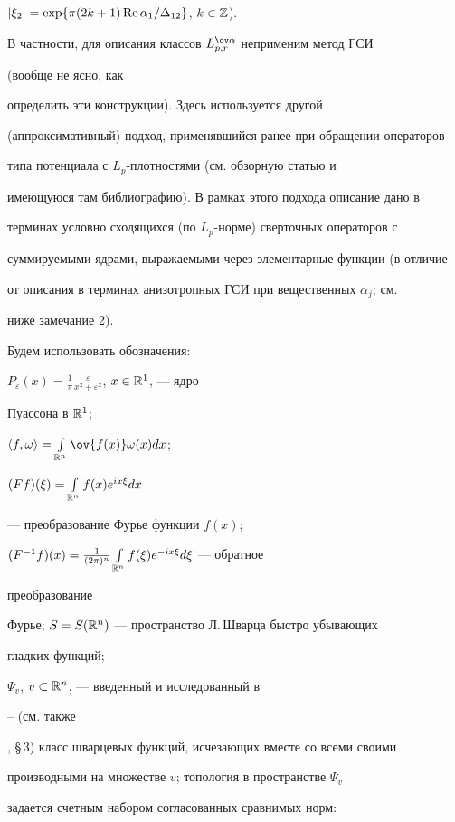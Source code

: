 $|\xi_2|=\exp\{\pi(2k+1)\operatorname{Re}\alpha_1/\Delta_{12}\}$, $k\in\Bbb Z$).


В частности, для описания классов $\spaceL$ неприменим метод ГСИ


(вообще не ясно, как


определить эти конструкции). Здесь используется другой


(аппроксимативный) подход, применявшийся ранее при обращении операторов


типа потенциала с $L_p$-плотностями (см. обзорную статью \cite{15} и


имеющуюся там библиографию). В рамках этого подхода описание дано в


терминах условно сходящихся (по $L_p$-норме) сверточных операторов с


суммируемыми ядрами, выражаемыми через элементарные функции (в отличие


от описания в терминах анизотропных ГСИ при вещественных $\alpha_j$; см.


ниже замечание 2).





Будем использовать обозначения:


$P_\varepsilon(x)=\frac{1}{\pi}


\frac{\varepsilon}{x^2+\varepsilon^2}$, $x\in\Bbb R^1$, --- ядро


Пуассона в $\Bbb R^1$;


$\la f,\omega\ra=\int\limits_{\Bbb R^n}\ov{f(x)}\omega(x)dx$;


$(Ff)(\xi)=\int\limits_{\Bbb R^n}f(x)e^{ix\xi}dx$


--- преобразование Фурье функции $f(x)$;


$(F^{-1}f)(x)=\frac{1}{(2\pi)^n}\int\limits_{\Bbb R^n}


f(\xi)e^{-ix\xi}d\xi$ --- обратное


преобразование


Фурье; $S=S(\Bbb R^n)$ --- пространство Л.\,Шварца быстро убывающих


гладких функций;


$\Psi_v$, $v\subset\Bbb R^n$, --- введенный и исследованный в


\cite{16}--\cite{19} (см. также


\cite{8}, \S\,3) класс шварцевых функций, исчезающих вместе со всеми своими


производными на множестве $v$; топология в пространстве $\Psi_v$


задается счетным набором согласованных сравнимых норм:


